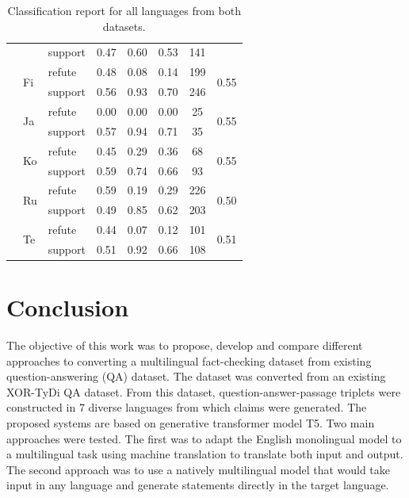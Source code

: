 \begin{table}[H]
\begin{tabular}{l|llccccc}
         & & support & 0.47 & 0.60 & 0.53 & 141 &  \\
        \cline{2-8}
         & \multirow{2}{*}{Fi} & refute & 0.48 & 0.08 & 0.14 & 199 & \multirow{2}{*}{0.55} \\
         & & support & 0.56 & 0.93 & 0.70 & 246 &  \\
        \cline{2-8}
         & \multirow{2}{*}{Ja} & refute & 0.00 & 0.00 & 0.00 & 25 & \multirow{2}{*}{0.55} \\
         & & support & 0.57 & 0.94 & 0.71 & 35 &  \\
        \cline{2-8}
         & \multirow{2}{*}{Ko} & refute & 0.45 & 0.29 & 0.36 & 68 & \multirow{2}{*}{0.55} \\
         & & support & 0.59 & 0.74 & 0.66 & 93 &  \\
        \cline{2-8}
         & \multirow{2}{*}{Ru} & refute & 0.59 & 0.19 & 0.29 & 226 & \multirow{2}{*}{0.50} \\
         & & support & 0.49 & 0.85 & 0.62 & 203 &  \\
        \cline{2-8}
         & \multirow{2}{*}{Te} & refute & 0.44 & 0.07 & 0.12 & 101 & \multirow{2}{*}{0.51} \\
         & & support & 0.51 & 0.92 & 0.66 & 108 &  \\
        \hline
    \end{tabular}
    \caption{Classification report for all languages from both datasets.}
    \label{tab:all_classification_report}
\end{table}



\chapter{Conclusion}\label{c8}
The objective of this work was to propose, develop and compare different approaches to converting a multilingual fact-checking dataset from existing question-answering (QA) dataset. The dataset was converted from an existing XOR-TyDi QA dataset. From this dataset, question-answer-passage triplets were constructed in 7 diverse languages from which claims were generated. The proposed systems are based on generative transformer model T5. Two main approaches were tested. The first was to adapt the English monolingual model to a multilingual task using machine translation to translate both input and output. The second approach was to use a natively multilingual model that would take input in any language and generate statements directly in the target language.

